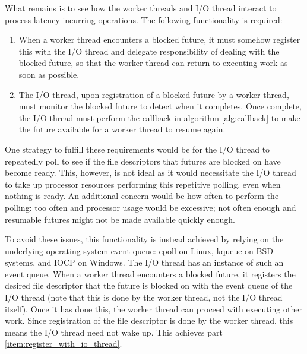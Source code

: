 \documentclass[bsc,frontabs,singlespacing,parskip,deptreport,normalheadings]{infthesis}
\begin{document}
What remains is to see how the worker threads and I/O thread interact to process
latency-incurring operations. The following functionality is required:

\begin{enumerate}
    \item \label{item:register_with_io_thread} When a worker thread encounters a
        blocked future, it must somehow register this with the I/O thread and
        delegate responsibility of dealing with the blocked future, so that the
        worker thread can return to executing work as soon as possible.
    \item \label{item:monitor_future} The I/O thread, upon registration of a
        blocked future by a worker thread, must monitor the blocked future to
        detect when it completes. Once complete, the I/O thread must perform the
        callback in algorithm \ref{alg:callback} to make the future available
        for a worker thread to resume again.
\end{enumerate}

One strategy to fulfill these requirements would be for the I/O thread to
repeatedly poll to see if the file descriptors that futures are blocked on have
become ready. This, however, is not ideal as it would necessitate the I/O thread
to take up processor resources performing this repetitive polling, even when
nothing is ready. An additional concern would be how often to perform the
polling: too often and processor usage would be excessive; not often enough and
resumable futures might not be made available quickly enough.

To avoid these issues, this functionality is instead achieved by relying on the
underlying operating system event queue: epoll on Linux, kqueue on BSD systems,
and IOCP on Windows. The I/O thread has an instance of such an event queue. When
a worker thread encounters a blocked future, it registers the desired file
descriptor that the future is blocked on with the event queue of the I/O thread
(note that this is done by the worker thread, not the I/O thread itself). Once
it has done this, the worker thread can proceed with executing other work. Since
registration of the file descriptor is done by the worker thread, this means the
I/O thread need not wake up. This achieves part
\ref{item:register_with_io_thread}.
\end{document}
